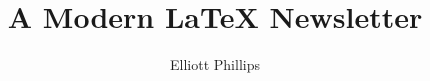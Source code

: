 \documentclass[]{fore}
\title[\TeX{} Newsletter]{A Modern \LaTeX{} Newsletter}
\author{Elliott Phillips}
\institute{Office for National Statistics}
\date{\currentmonthyear}
\begin{document}
	
%

\loadpages
\end{document}
